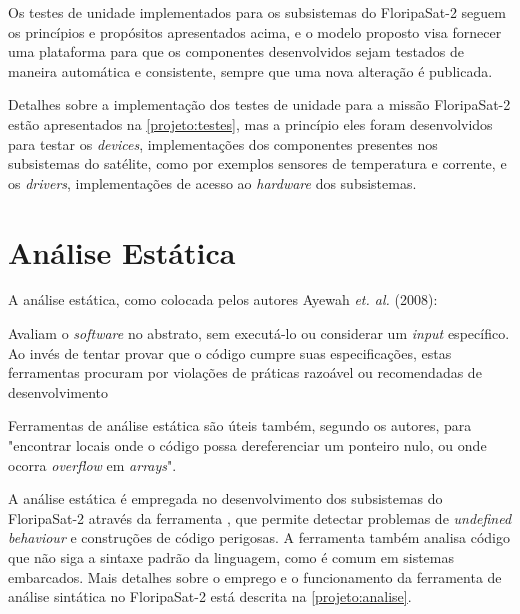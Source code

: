 Os testes de unidade implementados para os subsistemas do FloripaSat-2 seguem os princípios e propósitos apresentados acima, e o modelo proposto visa fornecer uma plataforma para que os componentes desenvolvidos sejam testados de maneira automática e consistente, sempre que uma nova alteração é publicada.

Detalhes sobre a implementação dos testes de unidade para a missão FloripaSat-2 estão apresentados na \autoref{projeto:testes}, mas a princípio eles foram desenvolvidos para testar os \textit{devices}, implementações dos componentes presentes nos subsistemas do satélite, como por exemplos sensores de temperatura e corrente, e os \textit{drivers}, implementações de acesso ao \textit{hardware} dos subsistemas.

\section{Análise Estática}
\label{proposta:analise}

A análise estática, como colocada pelos autores Ayewah \textit{et. al.} (2008):

\begin{citacao}
\hspace{1,2cm}
Avaliam o \textit{software} no abstrato, sem executá-lo ou considerar um \textit{input} específico. Ao invés de tentar provar que o código cumpre suas especificações, estas ferramentas procuram por violações de práticas razoável ou recomendadas de desenvolvimento\cite{nathaniel-2008}
\end{citacao}

Ferramentas de análise estática são úteis também, segundo os autores, para "encontrar locais onde o código possa dereferenciar um ponteiro nulo, ou onde ocorra \textit{overflow} em \textit{arrays}"\cite{nathaniel-2008}.

A análise estática é empregada no desenvolvimento dos subsistemas do FloripaSat-2 através da ferramenta \cite{cppcheck}, que permite detectar problemas de \textit{undefined behaviour} e construções de código perigosas. A ferramenta também analisa código que não siga a sintaxe padrão da linguagem, como é comum em sistemas embarcados. Mais detalhes sobre o emprego e o funcionamento da ferramenta de análise sintática no FloripaSat-2 está descrita na \autoref{projeto:analise}.







